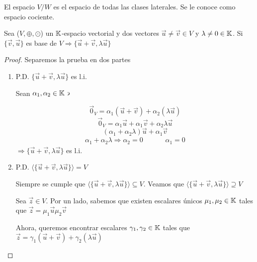 \begin{remark}
    El espacio $V / W$ es el espacio de todas las clases laterales. Se le conoce como espacio cociente. 
\end{remark}

\begin{theorem}
     Sea ($V, \oplus, \odot$) un $\mathbb{K}$-espacio vectorial y dos vectores $\vec{u} \neq \vec{v} \in V$ y $\lambda \neq 0 \in \mathbb{K}$. Si $\{ \vec{v}, \vec{u} \}$ es base de $V \Rightarrow \{ \vec{u} + \vec{v}, \lambda \vec{u} \}$
\end{theorem}

\begin{proof}
Separemos la prueba en dos partes
\begin{enumerate}
    \item P.D. $\{ \vec{u} + \vec{v}, \lambda \vec{u} \}$ es l.i.

    Sean ${\alpha}_{1}, {\alpha}_{2} \in \mathbb{K} \backepsilon$ 

    \begin{equation*}
        {\vec{0}}_{V} = {\alpha}_{1}(\vec{u} + \vec{v})+ {\alpha}_{2}(\lambda \vec{u})
    \end{equation*}
        \begin{equation*}
        {\vec{0}}_{V} = {\alpha}_{1}\vec{u} + {\alpha}_{1}\vec{v}+ {\alpha}_{2}\lambda \vec{u}
    \end{equation*}
    \begin{equation*}
        ({\alpha}_{1}+ {\alpha}_{2} \lambda) \vec{u} + {\alpha}_{1}\vec{v}
    \end{equation*}
    \begin{align*}
        {\alpha}_{1}+ {\alpha}_{2} \lambda \Rightarrow {\alpha}_{2} = 0 &&&& {\alpha}_{1} = 0
    \end{align*}
    $\Rightarrow \{ \vec{u} + \vec{v}, \lambda \vec{u} \}$ es l.i.

    \item P.D. $\langle \{ \vec{u} + \vec{v}, \lambda \vec{u} \} \rangle = V$

    Siempre se cumple que $\langle \{ \vec{u} + \vec{v}, \lambda \vec{u} \} \rangle \subseteq V$. Veamos que $\langle \{ \vec{u} + \vec{v}, \lambda \vec{u} \} \rangle \supseteq V$

    Sea $\vec{z} \in V$. Por un lado, sabemos que existen escalares únicos ${\mu}_{1}, {\mu}_{2} \in \mathbb{K} $ tales que $\vec{z} = {\mu}_{1}\vec{u} {\mu}_{2}\vec{v}$

    Ahora, queremos encontrar escalares ${\gamma}_{1}, {\gamma}_{2} \in \mathbb{K} $ tales que $\vec{z} = {\gamma}_{1}(\vec{u} + \vec{v}) + {\gamma}_{2}(\lambda \vec{u})$


\end{enumerate}
\end{proof}
